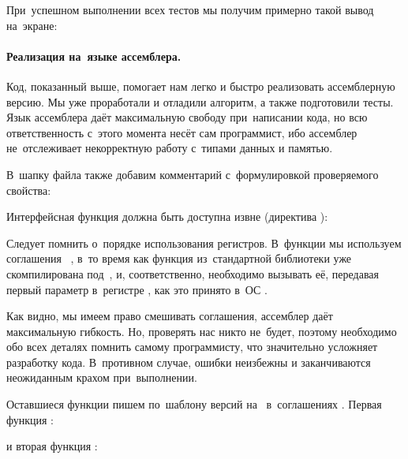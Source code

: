 \noindent При~успешном выполнении всех тестов мы получим примерно такой вывод на~экране:




\paragraph{Реализация на~языке ассемблера.}
Код, показанный выше, помогает нам легко и быстро реализовать ассемблерную версию. Мы уже проработали и отладили алгоритм, а также подготовили тесты. Язык ассемблера даёт максимальную свободу при~написании кода, но всю ответственность с~этого момента несёт сам программист, ибо ассемблер не~отслеживает некорректную работу с~типами данных и памятью.

В~шапку файла  также добавим комментарий с~формулировкой проверяемого свойства:


Интерфейсная функция должна быть доступна извне (директива ):


\noindent Следует помнить о~порядке использования регистров. В~функции  мы используем соглашения ~, в~то время как функция  из~стандартной библиотеки уже скомпилирована под~, и, соответственно, необходимо вызывать её, передавая первый параметр в~регистре , как это принято в~ОС .

Как видно, мы имеем право смешивать соглашения, ассемблер даёт максимальную гибкость. Но, проверять нас никто не~будет, поэтому необходимо обо всех деталях помнить самому программисту, что значительно усложняет разработку кода. В~противном случае, ошибки неизбежны и заканчиваются неожиданным крахом при~выполнении.

Оставшиеся функции пишем по~шаблону версий на~ в~соглашениях . Первая функция :


\noindent и вторая функция :


